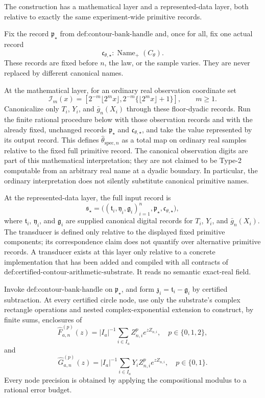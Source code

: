 The construction has a mathematical layer and a represented-data layer, both relative to exactly the same experiment-wide primitive records.

Fix the record \(\mathfrak p_{\star}\) from \(\text{def:contour-bank-handle}\) and, once for all, fix one actual record
\[
 \mathfrak c_{\theta,\star}:\operatorname{Name}_{+}(C_{\theta}).
\]
These records are fixed before \(n\), the law, or the sample varies.  They are never replaced by different canonical names.

At the mathematical layer, for an ordinary real observation coordinate set
\[
 \mathcal I_m(x)=
 \left[2^{-m}\lfloor2^m x\rfloor,
       2^{-m}\{\lfloor2^m x\rfloor+1\}\right],
 \qquad m\ge1.
\]
Canonicalize only \(T_i\), \(Y_i\), and \(\bar g_n(X_i)\) through these floor-dyadic records.  Run the finite rational procedure below with those observation records and with the already fixed, unchanged records \(\mathfrak p_{\star}\) and \(\mathfrak c_{\theta,\star}\), and take the value represented by its output record.  This defines \(\widehat\theta_{\mathrm{spec},n}\) as a total map on ordinary real samples relative to the fixed full primitive record.  The canonical observation digits are part of this mathematical interpretation; they are not claimed to be Type-2 computable from an arbitrary real name at a dyadic boundary.  In particular, the ordinary interpretation does not silently substitute canonical primitive names.

At the represented-data layer, the full input record is
\[
 \mathfrak s_{\star}=
 \bigl((\mathfrak t_i,\mathfrak y_i,\mathfrak g_i)_{i=1}^n,
       \mathfrak p_{\star},\mathfrak c_{\theta,\star}\bigr),
\]
where \(\mathfrak t_i\), \(\mathfrak y_i\), and \(\mathfrak g_i\) are supplied canonical digital records for \(T_i\), \(Y_i\), and \(\bar g_n(X_i)\).  The transducer is defined only relative to the displayed fixed primitive components; its correspondence claim does not quantify over alternative primitive records.  A transducer exists at this layer only relative to a concrete implementation that has been added and compiled with all contracts of \(\text{def:certified-contour-arithmetic-substrate}\).  It reads no semantic exact-real field.

Invoke \(\text{def:contour-bank-handle}\) on \(\mathfrak p_{\star}\), and form \(\mathfrak z_i=\mathfrak t_i-\mathfrak g_i\) by certified subtraction.  At every certified circle node, use only the substrate's complex rectangle operations and nested complex-exponential extension to construct, by finite sums, enclosures of
\[
 \widehat F_{a,n}^{(p)}(z)
 =|I_a|^{-1}\sum_{i\in I_a}Z_{n,i}^{p}e^{zZ_{n,i}},
 \quad p\in\{0,1,2\},
\]
and
\[
 \widehat G_{a,n}^{(p)}(z)
 =|I_a|^{-1}\sum_{i\in I_a}Y_iZ_{n,i}^{p}e^{zZ_{n,i}},
 \quad p\in\{0,1\}.
\]
Every node precision is obtained by applying the compositional modulus to a rational error budget.

